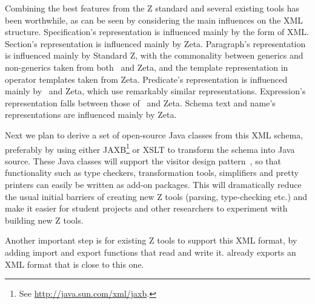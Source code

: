 \documentclass{llncs}  %
\newcommand{\Zeta}{Zeta}
\begin{document}
Combining the best features from the Z standard and several existing
tools has been worthwhile,
as can be seen by considering the main influences on the XML structure.
Specification's representation is influenced mainly by the form of XML.
Section's representation is influenced mainly by \Zeta.
Paragraph's representation is influenced mainly by Standard Z,
with the commonality between generics and non-generics taken from
both \CADiZ\ and \Zeta,
and the template representation in operator templates taken from \Zeta.
Predicate's representation is influenced mainly by \CADiZ\ and \Zeta,
which use remarkably similar representations.
Expression's representation falls between those of \CADiZ\ and \Zeta.
Schema text and name's representations are influenced mainly by \Zeta.

Next we plan to derive a set of open-source Java classes from this XML
schema, preferably by using either JAXB\footnote{See
  \url{http://java.sun.com/xml/jaxb}.} or XSLT to 
transform the schema into Java source. 
These Java classes will support the visitor design
pattern~\cite{gamma:design-patts95}, so that functionality such as type
checkers, 
transformation tools, simplifiers and pretty printers can easily be written
as add-on packages.  This will dramatically reduce the usual initial
barriers of creating new Z tools (parsing, type-checking etc.) and make it
easier for student projects and other researchers to experiment with
building new Z tools.

Another important step is for existing Z tools to support this
XML format, by adding import and export functions that read and write it.
{\CADiZ} already exports an XML format that is close to this one.





\appendix
\end{document}

